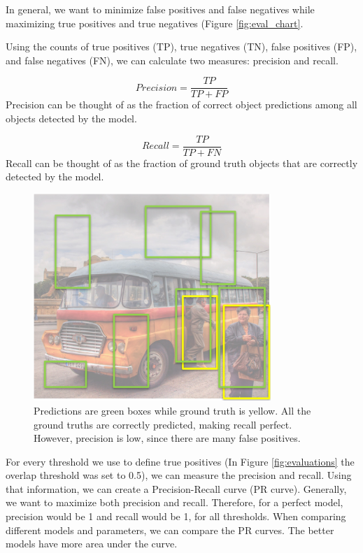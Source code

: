 \documentclass{article}
\begin{document}
In general, we want to minimize false positives and false negatives while maximizing true positives and true negatives (Figure \ref{fig:eval_chart}.

Using the counts of true positives (TP), true negatives (TN), false positives (FP), and false negatives (FN), we can calculate two measures: precision and recall.

$$Precision = \frac{TP}{TP + FP}$$
Precision can be thought of as the fraction of correct object predictions among all objects detected by the model.

$$Recall = \frac{TP}{TP + FN}$$
Recall can be thought of as the fraction of ground truth objects that are correctly detected by the model. \\

\begin{figure}[ht]
\centering
	\includegraphics[width=0.8\textwidth]{prec_recall_pic.jpg}
    \caption{Predictions are green boxes while ground truth is yellow. All the ground truths are correctly predicted, making recall perfect. However, precision is low, since there are many false positives.}
\end{figure}

For every threshold we use to define true positives (In Figure \ref{fig:evaluations} the overlap threshold was set to 0.5), we can measure the precision and recall. Using that information, we can create a Precision-Recall curve (PR curve). Generally, we want to maximize both precision and recall. Therefore, for a perfect model, precision would be 1 and recall would be 1, for all thresholds. When comparing different models and parameters, we can compare the PR curves. The better models have more area under the curve. 
\end{document}
